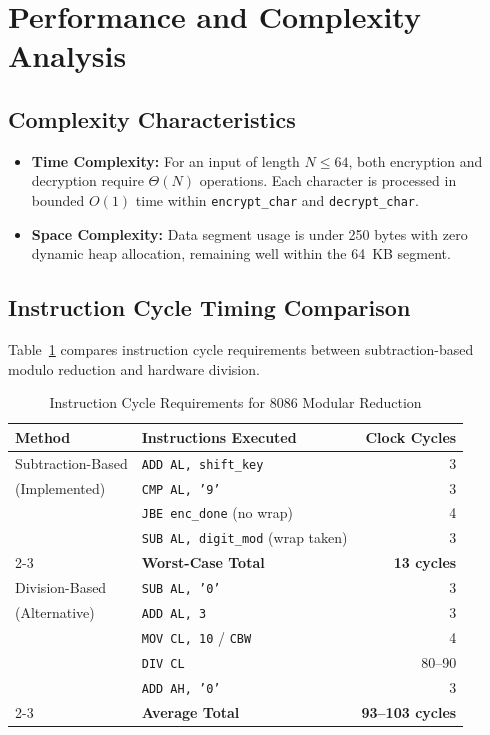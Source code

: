 \documentclass[11pt,a4paper]{article}
\begin{document}
\section{Performance and Complexity Analysis}

\subsection{Complexity Characteristics}
\begin{itemize}
    \item \textbf{Time Complexity:} For an input of length $N \le 64$, both encryption and decryption require $\Theta(N)$ operations. Each character is processed in bounded $O(1)$ time within \texttt{encrypt\_char} and \texttt{decrypt\_char}.
    \item \textbf{Space Complexity:} Data segment usage is under 250 bytes with zero dynamic heap allocation, remaining well within the 64~KB segment.
\end{itemize}

\subsection{Instruction Cycle Timing Comparison}
Table~\ref{tab:cycles} compares instruction cycle requirements between subtraction-based modulo reduction and hardware division.

\begin{table}[h]
\centering
\caption{Instruction Cycle Requirements for 8086 Modular Reduction}
\label{tab:cycles}
\begin{tabular}{llr}
\toprule
\textbf{Method} & \textbf{Instructions Executed} & \textbf{Clock Cycles} \\
\midrule
Subtraction-Based & \texttt{ADD AL, shift\_key} & 3 \\
(Implemented)     & \texttt{CMP AL, '9'} & 3 \\
                  & \texttt{JBE enc\_done} (no wrap) & 4 \\
                  & \texttt{SUB AL, digit\_mod} (wrap taken) & 3 \\
                  \cmidrule{2-3}
                  & \textbf{Worst-Case Total} & \textbf{13 cycles} \\
\midrule
Division-Based    & \texttt{SUB AL, '0'} & 3 \\
(Alternative)     & \texttt{ADD AL, 3} & 3 \\
                  & \texttt{MOV CL, 10} / \texttt{CBW} & 4 \\
                  & \texttt{DIV CL} & 80--90 \\
                  & \texttt{ADD AH, '0'} & 3 \\
                  \cmidrule{2-3}
                  & \textbf{Average Total} & \textbf{93--103 cycles} \\
\bottomrule
\end{tabular}
\end{table}
\end{document}
